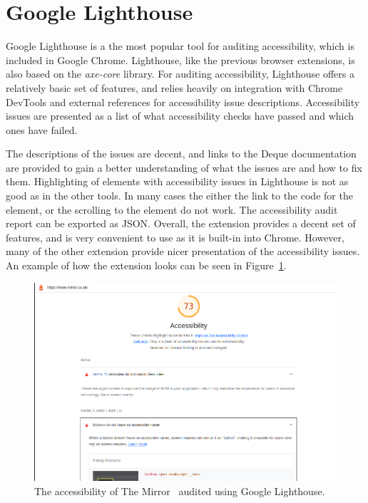 \section{Google Lighthouse}
Google Lighthouse \parencite{lighthouse} is a the most popular tool for auditing accessibility, which is included in Google Chrome.
Lighthouse, like the previous browser extensions, is also based on the \emph{axe-core} library.
For auditing accessibility, Lighthouse offers a relatively basic set of features, and relies heavily on integration with Chrome DevTools and external references for accessibility issue descriptions.
Accessibility issues are presented as a list of what accessibility checks have passed and which ones have failed.

The descriptions of the issues are decent, and links to the Deque documentation are provided to gain a better understanding of what the issues are and how to fix them.
Highlighting of elements with accessibility issues in Lighthouse is not as good as in the other tools.
In many cases the either the link to the code for the element, or the scrolling to the element do not work.
The accessibility audit report can be exported as JSON.
Overall, the extension provides a decent set of features, and is very convenient to use as it is built-in into Chrome.
However, many of the other extension provide nicer presentation of the accessibility issues. An example of how the extension looks can be seen in Figure~\ref{fig:lighthouse-ext}.


\begin{figure}[tp]
\centering
\includegraphics[keepaspectratio,width=\linewidth,height=\halfh]
{images/lighthouse-ext.png}

\caption[Google Lighthouse]{
The accessibility of The Mirror~\parencite{MirrorUK} audited using Google Lighthouse.
}
\label{fig:lighthouse-ext}
\end{figure}

